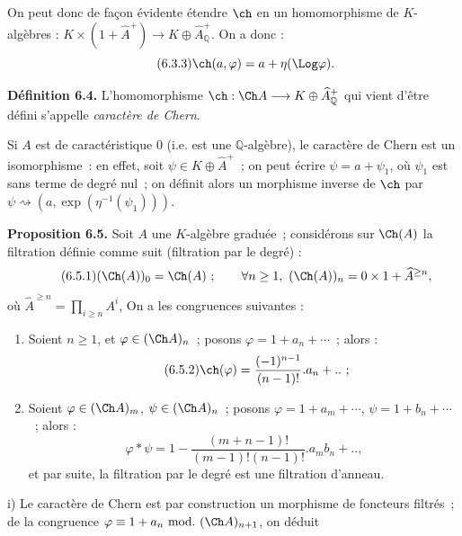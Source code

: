 
On
peut donc de façon évidente étendre \(\ch\) en un homomorphisme de \(K\)-algèbres : \(K\times(1+\widehat A^+)\longrightarrow K\oplus\widehat A_{\mathbb Q}^{+}\). On a donc :
\begin{equation}\tag{6.3.3}
  \ch(a,\varphi)=a+\eta(\Log\varphi).
\end{equation}

\textbf{Définition 6.4.} L'homomorphisme \(\ch:\Ch A\longrightarrow K\oplus\widehat A_{\mathbb Q}^{+}\) qui vient d'être défini s'appelle \emph{caractère de Chern}.

Si \(A\) est de caractéristique \(0\) (i.e. est une \(\mathbb Q\)-algèbre), le caractère de Chern est un isomorphisme~: en effet, soit \(\psi\in K\oplus\widehat A^+\)~; on peut écrire \(\psi=a+\psi_1\), où \(\psi_1\) est sans terme de degré nul~; on définit alors un morphisme inverse de \(\ch\) par \(\psi\rightsquigarrow(a,\exp(\eta^{-1}(\psi_1)))\).

\textbf{Proposition 6.5.} Soit \(A\) une \(K\)-algèbre graduée~; considérons sur \(\Ch(A)\) la filtration définie comme suit (filtration par le degré) :
\begin{equation}\tag{6.5.1}
  (\Ch(A))_0=\Ch(A)~;\qquad
  \forall n\ge1,\ (\Ch(A))_n=0\times 1+\widehat A^{\ge n},
\end{equation}
où \(\widehat A^{\ge n}=\prod_{i\ge n}A^i\), On a les congruences suivantes :

\begin{enumerate}[label=\roman*)]
\item Soient \(n\ge1\), et \(\varphi\in(\Ch A)_n\)~; posons \(\varphi=1+a_n+\cdots\)~; alors :
\begin{equation}\tag{6.5.2}
  \ch(\varphi)=\frac{(-1)^{n-1}}{(n-1)!}.a_n+..~;
\end{equation}

\item Soient \(\varphi\in(\Ch A)_m\), \(\psi\in(\Ch A)_n\)~; posons
\(\varphi=1+a_m+\cdots\), \(\psi=1+b_n+\cdots\)~; alors :
\begin{equation}\tag{6.5.3}
  \varphi*\psi
  =
  1-\frac{(m+n-1)!}{(m-1)!(n-1)!}.a_m b_n+..,
\end{equation}
et par suite, la filtration par le degré est une filtration d'anneau.
\end{enumerate}

i) Le caractère de Chern est par construction un morphisme de foncteurs filtrés~; de la congruence \(\varphi\equiv1+a_n\ \mathrm{mod.}\ (\Ch A)_{n+1}\), on déduit
